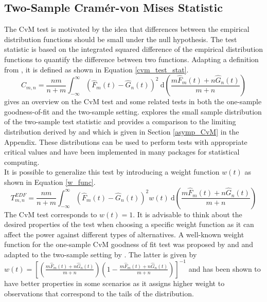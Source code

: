 \documentclass[12pt, a4paper]{article}
\theoremstyle{MAstyle} \newtheorem{assumption}{Assumption}[section]
\theoremstyle{MAstyle} \newtheorem{definition}{Definition}[section]
\theoremstyle{MAstyle} \newtheorem{theorem}{Theorem}[section]
\begin{document}
		\subsection{Two-Sample Cram\'{e}r-von Mises Statistic}\label{Two_sample_CvM}
			The CvM test is motivated by the idea that differences between the empirical distribution functions should be small under the null hypothesis. The test statistic is based on the integrated squared difference of the empirical distribution functions to quantify the difference between two functions.
			Adapting a definition from \cite{buning_nichtparametrische_2013}, it is defined as shown in Equation \ref{cvm_test_stat}.
			\begin{equation}\label{cvm_test_stat}
				C_{m,n} = \frac{nm}{n+m} \int_{-\infty}^{\infty}\left(\hat{F}_{m}(t) - \hat{G}_{n}(t)\right)^{2} \ \mathrm{d} \left(\frac{m \hat{F}_{m}(t) + n \hat{G}_{n}(t)}{m+n}\right) 
			\end{equation}
			\cite{darling_kolmogorov-smirnov_1957} gives an overview on the CvM test and some related tests in both the one-sample goodness-of-fit and the two-sample setting. \cite{anderson_distribution_1962} explores the small sample distribution of the two-sample test statistic and provides a comparison to the limiting distribution derived by \cite{rosenblatt_limit_1952} and \cite{fisz_result_1960} which is given in Section \ref{asymp_CvM} in the Appendix. These distributions can be used to perform tests with appropriate critical values and have been implemented in many packages for statistical computing.\\
			
			It is possible to generalize this test by introducing a weight function $w(t)$ as shown in Equation \ref{w_func}. 
			\begin{equation}\label{w_func}
				T^{\textit{EDF}}_{m,n} = \frac{nm}{n+m} \int_{-\infty}^{\infty}\left(\hat{F}_{m}(t) - \hat{G}_{n}(t)\right)^{2} w(t) \ \mathrm{d} \left(\frac{m \hat{F}_{m}(t) + n \hat{G}_{n}(t)}{m+n}\right)
			\end{equation}
			The CvM test corresponds to $w(t) = 1$. It is advisable to think about the desired properties of the test when choosing a specific weight function as it can affect the power against different types of alternatives. A well-known weight function for the one-sample CvM goodness of fit test was proposed by \cite{anderson_asymptotic_1952} and \cite{anderson_test_1954} and adapted to the two-sample setting by \cite{pettitt_two-sample_1976}. The latter is given by $w(t) = \left[ \left(\frac{m \hat{F}_m(t) + n \hat{G}_n(t)}{m+n}\right)\left(1 - \frac{m \hat{F}_m(t) + n \hat{G}_n(t)}{m+n}\right) \right]^{-1}$ and has been shown to have better properties in some scenarios as it assigns higher weight to observations that correspond to the tails of the distribution.					
			
\end{document}
